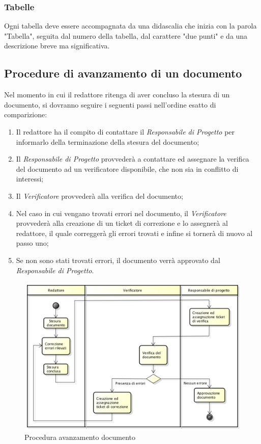 \subsubsection{Tabelle}
Ogni tabella deve essere accompagnata da una didascalia che inizia con la parola "Tabella", seguita dal numero della tabella, dal carattere "due punti" e da una  descrizione breve ma significativa.

\subsection{Procedure di avanzamento di un documento}
Nel momento in cui il redattore ritenga di aver concluso la stesura di un documento, si dovranno seguire i seguenti passi nell'ordine esatto di comparizione:
\begin{enumerate}
	\item Il redattore ha il compito di contattare il \textit{Responsabile di Progetto} per informarlo della terminazione della stesura del documento;
	\item Il \textit{Responsabile di Progetto} provvederà a contattare ed assegnare la verifica del documento ad un verificatore disponibile, che non sia in conflitto di interessi;
	\item Il \textit{Verificatore} provvederà alla  verifica del documento;
	\item Nel caso in cui vengano trovati errori nel documento, il \textit{Verificatore} provvederà alla creazione di un \gls{ticket} di correzione e lo assegnerà al redattore, il quale correggerà gli errori trovati e infine si tornerà di nuovo al passo uno;
	\item Se non sono stati trovati errori, il documento verrà approvato dal \textit{Responsabile di Progetto}. 
\end{enumerate}
\begin{figure}[h]
\centering
\includegraphics[width=0.9\linewidth]{img/proceduraDocumenti}
\caption[Procedura avanzamento documento]{Procedura avanzamento documento}
\label{fig:proceduraDocumenti}
\end{figure}





